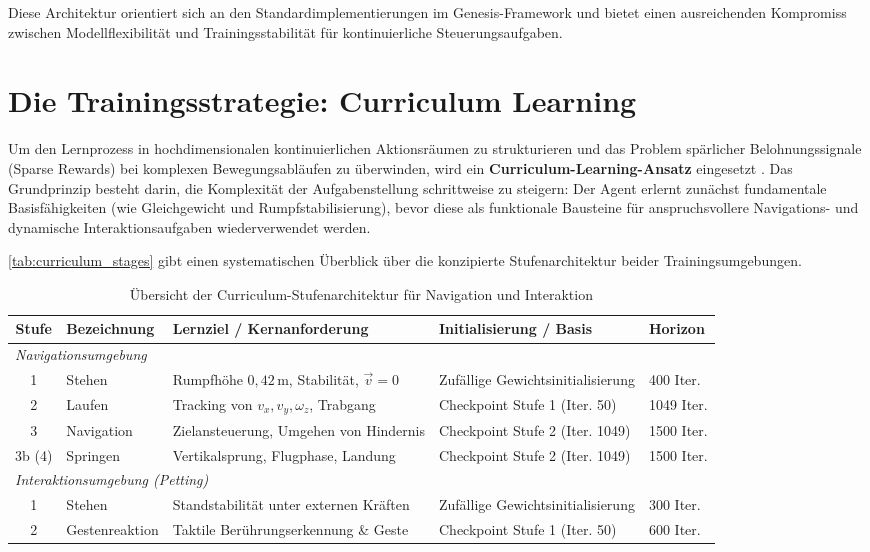 Diese Architektur orientiert sich an den Standardimplementierungen im Genesis-Framework \cite{authorsGenesisGenerativeUniversal2024} und bietet einen ausreichenden Kompromiss zwischen Modellflexibilität und Trainingsstabilität für kontinuierliche Steuerungsaufgaben.

\section{Die Trainingsstrategie: Curriculum Learning}

Um den Lernprozess in hochdimensionalen kontinuierlichen Aktionsräumen zu strukturieren und das Problem spärlicher Belohnungssignale (Sparse Rewards) bei komplexen Bewegungsabläufen zu überwinden, wird ein \textbf{Curriculum-Learning-Ansatz} eingesetzt \cite{heessEmergenceLocomotionBehaviours2017, rudin2022learningwalkminutesusing}. Das Grundprinzip besteht darin, die Komplexität der Aufgabenstellung schrittweise zu steigern: Der Agent erlernt zunächst fundamentale Basisfähigkeiten (wie Gleichgewicht und Rumpfstabilisierung), bevor diese als funktionale Bausteine für anspruchsvollere Navigations- und dynamische Interaktionsaufgaben wiederverwendet werden.

\autoref{tab:curriculum_stages} gibt einen systematischen Überblick über die konzipierte Stufenarchitektur beider Trainingsumgebungen.

\begin{table}[htbp]
\centering
\small
\begin{tabular}{cllll}
\toprule
\textbf{Stufe} & \textbf{Bezeichnung} & \textbf{Lernziel / Kernanforderung} & \textbf{Initialisierung / Basis} & \textbf{Horizon} \\
\midrule
\multicolumn{5}{l}{\textit{Navigationsumgebung}} \\
1 & Stehen & Rumpfhöhe $0{,}42\,\text{m}$, Stabilität, $\vec{v} = 0$ & Zufällige Gewichtsinitialisierung & 400 Iter. \\
2 & Laufen & Tracking von $v_x, v_y, \omega_z$, Trabgang & Checkpoint Stufe 1 (Iter. 50) & 1049 Iter. \\
3 & Navigation & Zielansteuerung, Umgehen von Hindernis & Checkpoint Stufe 2 (Iter. 1049) & 1500 Iter. \\
3b (4) & Springen & Vertikalsprung, Flugphase, Landung & Checkpoint Stufe 2 (Iter. 1049) & 1500 Iter. \\
\midrule
\multicolumn{5}{l}{\textit{Interaktionsumgebung (Petting)}} \\
1 & Stehen & Standstabilität unter externen Kräften & Zufällige Gewichtsinitialisierung & 300 Iter. \\
2 & Gestenreaktion & Taktile Berührungserkennung \& Geste & Checkpoint Stufe 1 (Iter. 50) & 600 Iter. \\
\bottomrule
\end{tabular}
\normalsize
\caption{Übersicht der Curriculum-Stufenarchitektur für Navigation und Interaktion}
\label{tab:curriculum_stages}
\end{table}

